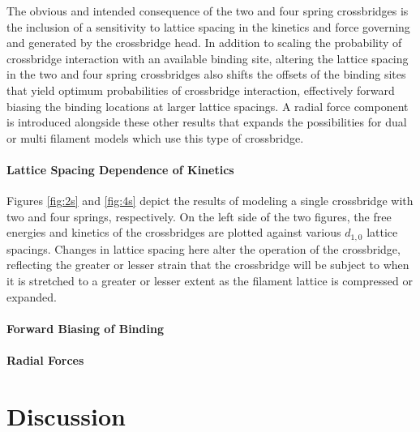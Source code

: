 \documentclass[]{article}
\begin{document}
The obvious and intended consequence of the two and four spring crossbridges is the inclusion of a sensitivity to lattice spacing in the kinetics and force governing and generated by the crossbridge head. 
In addition to scaling the probability of crossbridge interaction with an available binding site, altering the lattice spacing in the two and four spring crossbridges also shifts the offsets of the binding sites that yield optimum probabilities of crossbridge interaction, effectively forward biasing the binding locations at larger lattice spacings.
A radial force component is introduced alongside these other results that expands the possibilities for dual or multi filament models which use this type of crossbridge.

\paragraph{Lattice Spacing Dependence of Kinetics} %
Figures \ref{fig:2s} and \ref{fig:4s} depict the results of modeling a single crossbridge with two and four springs, respectively.
On the left side of the two figures, the free energies and kinetics of the crossbridges are plotted against various $d_{1,0}$ lattice spacings. 
Changes in lattice spacing here alter the operation of the crossbridge, reflecting the greater or lesser strain that the crossbridge will be subject to when it is stretched to a greater or lesser extent as the filament lattice is compressed or expanded.

\paragraph{Forward Biasing of Binding} %


\paragraph{Radial Forces} %




\section{Discussion} %

\end{document}
